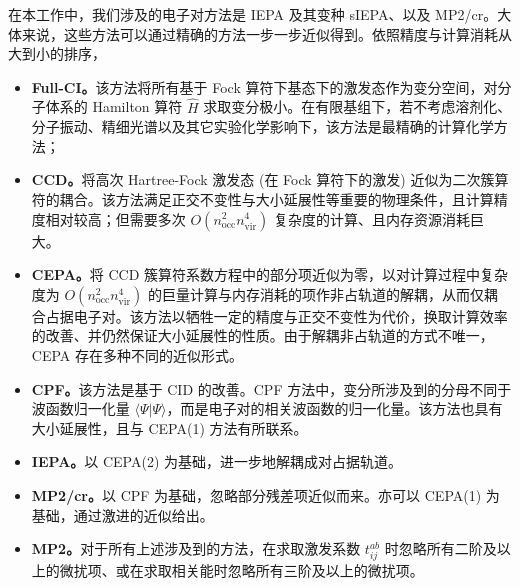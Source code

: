 在本工作中，我们涉及的电子对方法是 IEPA 及其变种 sIEPA、以及 MP2/cr。大体来说，这些方法可以通过精确的方法一步一步近似得到。依照精度与计算消耗从大到小的排序，
\begin{itemize}[nosep]
  \item \textbf{Full-CI。}该方法将所有基于 Fock 算符下基态下的激发态作为变分空间，对分子体系的 Hamilton 算符 $\hat H$ 求取变分极小。在有限基组下，若不考虑溶剂化、分子振动、精细光谱以及其它实验化学影响下，该方法是最精确的计算化学方法；
  \item \textbf{CCD。}将高次 Hartree-Fock 激发态 (在 Fock 算符下的激发) 近似为二次簇算符的耦合。该方法满足正交不变性与大小延展性等重要的物理条件，且计算精度相对较高；但需要多次 $O(n_\mathrm{occ}^2 n_\mathrm{vir}^4)$ 复杂度的计算、且内存资源消耗巨大。
  \item \textbf{CEPA。}将 CCD 簇算符系数方程中的部分项近似为零，以对计算过程中复杂度为 $O(n_\mathrm{occ}^2 n_\mathrm{vir}^4)$ 的巨量计算与内存消耗的项作非占轨道的解耦，从而仅耦合占据电子对。该方法以牺牲一定的精度与正交不变性为代价，换取计算效率的改善、并仍然保证大小延展性的性质。由于解耦非占轨道的方式不唯一，CEPA 存在多种不同的近似形式。
  \item \textbf{CPF。}该方法是基于 CID 的改善。CPF 方法中，变分所涉及到的分母不同于波函数归一化量 $\langle \Psi | \Psi \rangle$，而是电子对的相关波函数的归一化量。该方法也具有大小延展性，且与 CEPA(1) 方法有所联系。
  \item \textbf{IEPA。}以 CEPA(2) 为基础，进一步地解耦成对占据轨道。
  \item \textbf{MP2/cr。}以 CPF 为基础，忽略部分残差项近似而来。亦可以 CEPA(1) 为基础，通过激进的近似给出。
  \item \textbf{MP2。}对于所有上述涉及到的方法，在求取激发系数 $t_{ij}^{ab}$ 时忽略所有二阶及以上的微扰项、或在求取相关能时忽略所有三阶及以上的微扰项。
\end{itemize}

